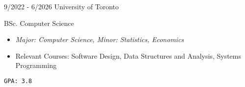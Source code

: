 \documentclass[9pt]{developercv} %
\begin{document}
\vspace{-10 pt}
\begin{entrylist}
    \entry
		{9/2022 - 6/2026}
		{University of Toronto}
		{}
		{BSc. Computer Science
        \vspace{5pt}
        \begin{itemize}[itemsep=3pt,topsep=0pt,parsep=0pt,partopsep=0pt, leftmargin=-1pt]
            \item \textit{Major: Computer Science, Minor: Statistics, Economics}
            \item Relevant Courses: Software Design, Data Structures and Analysis, Systems Programming
        \end{itemize}
        \vspace{5pt}
        \texttt{GPA: 3.8}
        }
\end{entrylist}
\end{document}
